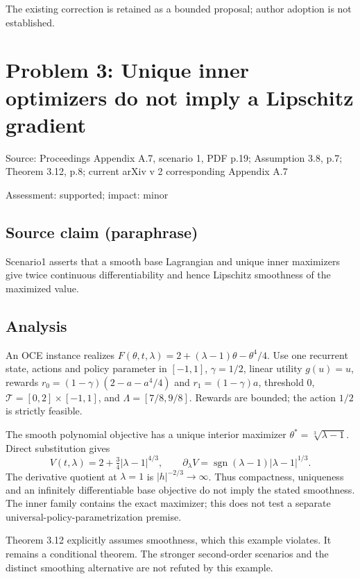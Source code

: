 \documentclass[11pt]{article}
\begin{document}
The existing correction is retained as a bounded proposal; author adoption is not established.

\section*{Problem 3: Unique inner optimizers do not imply a Lipschitz gradient}

Source: Proceedings Appendix A.7, scenario 1, PDF p.19; Assumption 3.8, p.7; Theorem 3.12, p.8; current arXiv v 2 corresponding Appendix A.7

Assessment: supported; impact: minor

\subsection*{Source claim (paraphrase)}

Scenario1 asserts that a smooth base Lagrangian and unique inner maximizers give twice continuous differentiability and hence Lipschitz smoothness of the maximized value.

\subsection*{Analysis}

An OCE instance realizes \(F(\theta,t,\lambda)=2+(\lambda-1)\theta-\theta^4/4\). Use one recurrent state, actions and policy parameter in \([-1,1]\), \(\gamma=1/2\), linear utility \(g(u)=u\), rewards \(r_0=(1-\gamma)(2-a-a^4/4)\) and \(r_1=(1-\gamma)a\), threshold \(0\), \(\mathcal T=[0,2]\times[-1,1]\), and \(\Lambda=[7/8,9/8]\). Rewards are bounded; the action \(1/2\) is strictly feasible.

The smooth polynomial objective has a unique interior maximizer \(\theta^*=\sqrt[3]{\lambda-1}\). Direct substitution gives \[V(t,\lambda)=2+\tfrac34|\lambda-1|^{4/3},\qquad\partial_\lambda V=\operatorname{sgn}(\lambda-1)|\lambda-1|^{1/3}.\] The derivative quotient at \(\lambda=1\) is \(|h|^{-2/3}\to\infty\). Thus compactness, uniqueness and an infinitely differentiable base objective do not imply the stated smoothness. The inner family contains the exact maximizer; this does not test a separate universal-policy-parametrization premise.

Theorem 3.12 explicitly assumes smoothness, which this example violates. It remains a conditional theorem. The stronger second-order scenarios and the distinct smoothing alternative are not refuted by this example.
\end{document}
